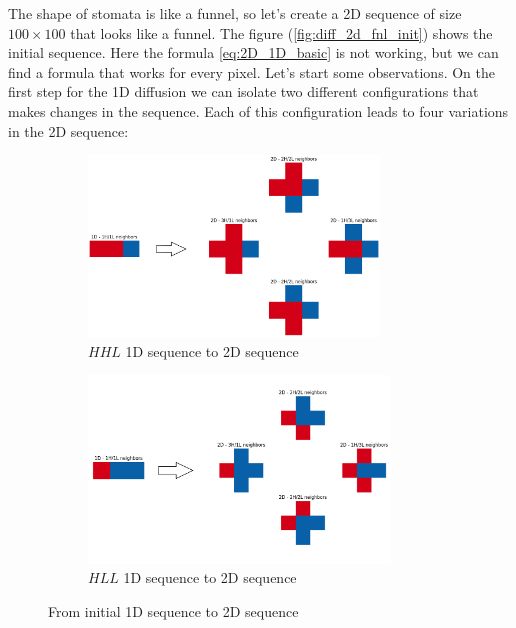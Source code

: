 The shape of stomata is like a funnel, so let's create a 2D sequence of size $100 
\times 100$ that looks like a funnel. The figure (\ref{fig:diff_2d_fnl_init}) shows the 
initial sequence. Here the formula \eqref{eq:2D_1D_basic} is not working, but we can find
a formula that works for every pixel. Let's start some observations. On the first step 
for the 1D diffusion we can isolate two different configurations that makes changes in 
the sequence. Each of this configuration leads to four variations in the 2D sequence:

\begin{figure}[ht]
    \centering
    \begin{subfigure}[b]{1\textwidth}
        \centering
        \includegraphics[width=0.85\textwidth]{figures/HHL_1D_to_2D.png}
        \caption{$HHL$ 1D sequence to 2D sequence}
        \label{fig:HHL_1D_to_2D}
    \end{subfigure}
    \hfill
    \begin{subfigure}[b]{1\textwidth}
        \centering
        \includegraphics[width=0.88\textwidth]{figures/HLL_1D_to_2D.png}
        \caption{$HLL$ 1D sequence to 2D sequence}
        \label{fig:HLL_1D_to_2D}
    \end{subfigure}
    \caption{From initial 1D sequence to 2D sequence}
    \label{fig:1D_to_2D}
\end{figure}

